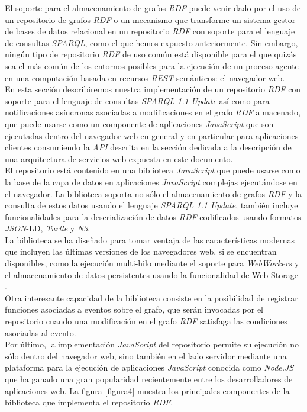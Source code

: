 El soporte para el almacenamiento de grafos \textit{RDF} puede venir dado por el uso de un repositorio de grafos \textit{RDF} o un mecanismo que transforme un sistema gestor de bases de datos relacional en un repositorio \textit{RDF} con soporte para el lenguaje de consultas \textit{SPARQL}, como el que hemos expuesto anteriormente. Sin embargo, ning\'un tipo de repositorio \textit{RDF} de uso com\'un est\'a disponible para el que quiz\'as sea el m\'as com\'un de los entornos posibles para la ejecuci\'on de un proceso agente en una computaci\'on basada en recursos \textit{REST} sem\'anticos: el navegador web.\\
En esta secci\'on describiremos nuestra implementaci\'on de un repositorio \textit{RDF} con soporte para el lenguaje de consultas \textit{SPARQL 1.1 Update} as\'i como para notificaciones as\'incronas asociadas a modificaciones en el grafo \textit{RDF} almacenado, que puede usarse como un componente de aplicaciones \textit{JavaScript} que son ejecutadas dentro del navegador web en general y en particular para aplicaciones clientes consumiendo la \textit{API} descrita en la secci\'on dedicada a la descripci\'on de una arquitectura de servicios web expuesta en este documento.\\
El repositorio est\'a contenido en una biblioteca \textit{JavaScript} que puede usarse como la base de la capa de datos en aplicaciones \textit{JavaScript} complejas ejecut\'andose en el navegador. La biblioteca soporta no s\'olo el almacenamiento de grafos \textit{RDF} y la consulta de estos datos usando el lenguaje \textit{SPARQL 1.1 Update}, tambi\'en incluye funcionalidades para la deserializaci\'on de datos \textit{RDF} codificados usando formatos \textit{JSON}-LD, \textit{Turtle} y \textit{N3}.\\
La biblioteca se ha dise\~nado para tomar ventaja de las caracter\'isticas modernas que incluyen las \'ultimas versiones de los navegadores web, si se encuentran disponibles, como la ejecuci\'on multi-hilo mediante el soporte para \textit{WebWorkers} \cite{hicksonweb} y el almacenamiento de datos persistentes usando la funcionalidad de Web Storage \cite{webstorage}.\\
Otra interesante capacidad de la biblioteca consiste en la posibilidad de registrar funciones asociadas a eventos sobre el grafo, que ser\'an invocadas por el repositorio cuando una modificaci\'on en el grafo \textit{RDF} satisfaga las condiciones asociadas al evento.\\
Por \'ultimo, la implementaci\'on \textit{JavaScript} del repositorio permite su ejecuci\'on no s\'olo dentro del navegador web, sino tambi\'en en el lado servidor mediante una plataforma para la ejecuci\'on de aplicaciones \textit{JavaScript} conocida como \textit{Node.JS} que ha ganado una gran popularidad recientemente entre los desarrolladores de aplicaciones web. La figura \ref{figura4} muestra los principales componentes de la biblioteca que implementa el repositorio \textit{RDF}.

